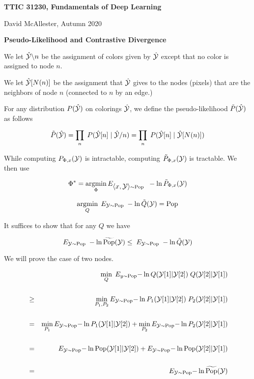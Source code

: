 




{\Huge

  \centerline{\bf TTIC 31230, Fundamentals of Deep Learning}
  \bigskip
  \centerline{David McAllester, Autumn 2020}
  \vfill
  \vfill
  \centerline{\bf Pseudo-Likelihood and Contrastive Divergence}
\vfill
\vfill
\vfill


We let {\color{red} $\hat{\cal Y} \backslash n$} be the assignment of colors given by $\hat{\cal Y}$ except that no color is assigned to node $n$.

\vfill
We let {\color{red} $\hat{\cal Y}[N(n)]$} be the assignment that $\hat{\cal Y}$ gives to the nodes (pixels) that are the neighbors of node $n$ (connected to $n$ by an edge.)


For any distribution $P(\hat{\cal Y})$ on colorings $\hat{\cal Y}$,
we define the {\color{red} pseudo-likelihood}  $\tilde{P}(\hat{\cal Y})$ as follows

{\color{red} $$\tilde{P}(\hat{\cal Y}) = \prod_n\;P(\hat{\cal Y}[n]\;|\; \hat{\cal Y}/n) = \prod_n\;P(\hat{\cal Y}[n]\;|\; \hat{\cal Y}[N(n)])$$}

\vfill
While computing $P_{\Phi,x}({\cal Y})$ is intractable, computing $\tilde{P}_{\Phi,x}({\cal Y})$ is tractable.  We then use

{\color{red} $$\Phi^* = \operatorname*{argmin}_\Phi E_{{\mbox{$\langle x,{\cal Y}\rangle$}} \sim \mathrm{Pop}}\;\;-\ln \tilde{P}_{\Phi,x}({\cal Y})$$}


{\color{red} $$\operatorname*{argmin}_Q \; E_{{\cal Y} \sim \mathrm{Pop}} \;-\ln \tilde{Q}({\cal Y}) = \mathrm{Pop}$$}

\vfill
It suffices to show that for any $Q$ we have

\vfill
$$ E_{{\cal Y} \sim \mathrm{Pop}}\;-\ln \widetilde{\mathrm{Pop}}({\cal Y}) \leq \;E_{{\cal Y} \sim \mathrm{Pop}}\;-\ln \tilde{Q}({\cal Y})$$


We will prove the case of two nodes.

\vfill
\begin{eqnarray*}
  & & \min_Q \;E_{y\sim \mathrm{Pop}}{-\ln Q({\cal Y}[1]|{\cal Y}[2])\;Q({\cal Y}[2]|{\cal Y}[1])} \\
  \\
  & \geq & \min_{P_1,P_2} E_{{\cal Y} \sim \mathrm{Pop}}{-\ln P_1({\cal Y}[1]|{\cal Y}[2])\;P_2({\cal Y}[2]|{\cal Y}[1])} \\
  \\
  & = & \min_{P_1} E_{{\cal Y} \sim \mathrm{Pop}}{-\ln P_1({\cal Y}[1]|{\cal Y}[2])} + \min_{P_2} E_{{\cal Y} \sim \mathrm{Pop}}{-\ln P_2({\cal Y}[2]|{\cal Y}[1])} \\
  \\
  & = & E_{{\cal Y} \sim \mathrm{Pop}}{-\ln \mathrm{Pop}({\cal Y}[1]|{\cal Y}[2])} + E_{{\cal Y} \sim \mathrm{Pop}}{-\ln \mathrm{Pop}({\cal Y}[2]|{\cal Y}[1])} \\
  \\
  & = & E_{{\cal Y} \sim \mathrm{Pop}}{-\ln \widetilde{\mathrm{Pop}}({\cal Y})}
\end{eqnarray*}

}
